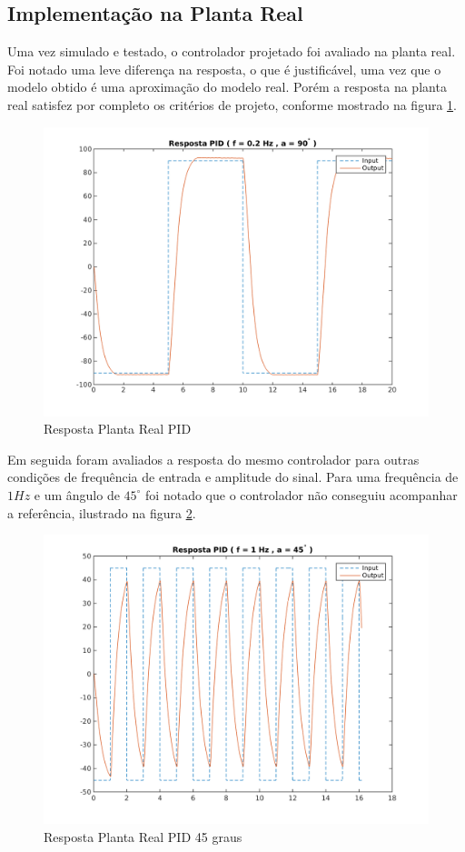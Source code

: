 \documentclass[a4paper,11pt]{article}
\begin{document}

\subsection{Implementação na Planta Real}

Uma vez simulado e testado, o controlador projetado foi avaliado na planta real. Foi notado uma leve diferença na resposta, o que é justificável, uma vez que o modelo obtido é uma aproximação do modelo real. Porém a resposta na planta real satisfez por completo os critérios de projeto, conforme mostrado na figura \ref{fig:quaser_pid}.

\begin{figure}[H]
    \centering
    \includegraphics[width=0.8\linewidth]{tex/img/quanserpid_s90num5.png}
    \caption{Resposta Planta Real PID}
    \label{fig:quaser_pid}
\end{figure}

Em seguida foram avaliados a resposta do mesmo controlador para outras condições de frequência de entrada e amplitude do sinal. Para uma frequência de $1Hz$ e um ângulo de $45^\circ$ foi notado que o controlador não conseguiu acompanhar a referência, ilustrado na figura \ref{fig:quanserpid_s45num1}.

\begin{figure}[H]
    \centering
    \includegraphics[width=0.8\linewidth]{tex/img/quanserpid_s45num1.png}
    \caption{Resposta Planta Real PID 45 graus}
    \label{fig:quanserpid_s45num1}
\end{figure}
\end{document}
